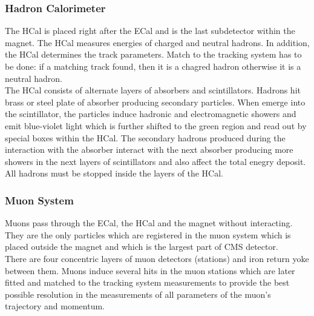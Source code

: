 
\subsubsection{Hadron Calorimeter}

The HCal is placed right after the ECal and is the last subdetector within the magnet. The HCal measures energies of charged and neutral hadrons. In addition, the HCal determines the track parameters. Match to the tracking system has to be done: if a matching track found, then it is a chagred hadron otherwise it is a neutral hadron. \\

The HCal consists of alternate layers of absorbers and scintillators. Hadrons hit brass or steel plate of absorber producing secondary particles. When emerge into the scintillator, the particles induce hadronic and electromagnetic showers and emit blue-violet light which is further shifted to the green region and read out by special boxes within the HCal. The secondary hadrons produced during the interaction with the absorber interact with the next absorber producing more showers in the next layers of scintillators and also affect the total enegry deposit. All hadrons must be stopped inside the layers of the HCal.\\


\subsubsection{Muon System}

Muons pass through the ECal, the HCal and the magnet without interacting. They are the only particles which are registered in the muon system which is placed outside the magnet and which is the largest part of CMS detector.\\

There are four concentric layers of muon detectors (stations) and iron return yoke between them. Muons induce several hits in the muon stations which are later fitted and matched to the tracking system measurements to provide the best possible resolution in the measurements of all parameters of the muon's trajectory and momentum.\\

